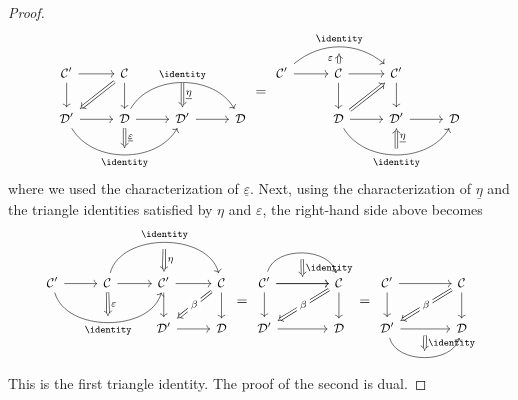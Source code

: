 \begin{proof}
\[\begin{tikzcd}[every cell/.append style = {font = \small}]
		\mathcal{C}' \arrow[r] \arrow[d] & \mathcal{C} \arrow[d] \arrow[Rightarrow, ld] & & \\
		\mathcal{D}' \arrow[r] \arrow[bend right=60, rr, "\identity"', "" {name=I}] & \mathcal{D} \arrow[r] \arrow[rr, bend left=60, "\identity", "" {name=J}] \arrow[Rightarrow, to=I, "\underline{\varepsilon}"] & \mathcal{D}' \arrow[r] \arrow[Rightarrow, from=J, "\underline{\eta}"] & \mathcal{D}
	\end{tikzcd} = \begin{tikzcd}[every cell/.append style = {font = \small}]
		\mathcal{C}' \arrow[r] \arrow[rr, bend left=40, "\identity", ""' {name=T}] & \mathcal{C} \arrow[r] \arrow[d] \arrow[Rightarrow, to=T, "\varepsilon" inner sep=0.4em] & \mathcal{C}' \arrow[d] & \\
 		& \mathcal{D} \arrow[r] \arrow[rr, bend right=60, "\identity"', "" {name=I}] \arrow[Rightarrow, ru] & \mathcal{D}' \arrow[r] \arrow[Rightarrow, from=I, "\underline{\eta}"'] & \mathcal{D}
	\end{tikzcd}\]
	where we used the characterization of $\underline{\varepsilon}$. Next,
	using the characterization of $\underline{\eta}$ and the triangle
	identities satisfied by $\eta$ and $\varepsilon$, the right-hand side above
	becomes
	\[\begin{tikzcd}[every cell/.append style = {font = \small}]
		\mathcal{C}' \arrow[r] \arrow[rr, bend right=75, "\identity"', "" {name=A}] & \mathcal{C} \arrow[r] \arrow[rr, bend left=75, "\identity", ""' {name=B}] \arrow[Rightarrow, to=A, "\varepsilon"] & \mathcal{C}' \arrow[r] \arrow[d] \arrow[Rightarrow, from=B, "\eta"] & \mathcal{C} \arrow[d] \arrow[Rightarrow, ld, "\beta" description] \\
		& & \mathcal{D}' \arrow[r] & \mathcal{D}
	\end{tikzcd} = \begin{tikzcd}[column sep=large, every cell/.append style = {font = \small}]
		\mathcal{C}' \arrow[r] \arrow[bend left=75, r, ""' {name=T}] \arrow[r, "" {name=B}] \arrow[d] & \mathcal{C} \arrow[d] \arrow[Rightarrow, ld, "\beta" description] \\
		\mathcal{D}' \arrow[r] & \mathcal{D} \arrow[Rightarrow, from=T, to=B, "\identity"]
	\end{tikzcd} = \begin{tikzcd}[column sep=large, every cell/.append style = {font = \small}]
		\mathcal{C}' \arrow[r] \arrow[d] & \mathcal{C} \arrow[d]  \arrow[Rightarrow, ld, "\beta" description] \\
		\mathcal{D}' \arrow[r, ""' {name=T}] \arrow[r, bend right=75, "" {name=B}] & \mathcal{D} \arrow[Rightarrow, from=T, to=B, "\identity"]
	\end{tikzcd}\]
	This is the first triangle identity. The proof of the second is dual.
\end{proof}
